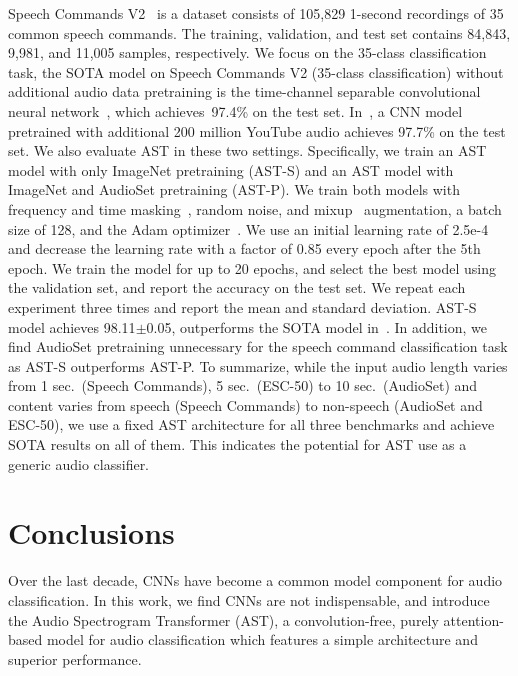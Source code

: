 \documentclass[a4paper]{article}
\begin{document}
Speech Commands V2~\cite{warden2018speech} is a dataset consists of 105,829 1-second recordings of 35 common speech commands. The training, validation, and test set contains 84,843, 9,981, and 11,005 samples, respectively. We focus on the 35-class classification task, the SOTA model on Speech Commands V2 (35-class classification) without additional audio data pretraining is the time-channel separable convolutional neural network~\cite{majumdar2020matchboxnet}, which achieves~97.4\% on the test set. In~\cite{lin2020training}, a CNN model pretrained with additional 200 million YouTube audio achieves 97.7\% on the test set. We also evaluate AST in these two settings. Specifically, we train an AST model with only ImageNet pretraining (AST-S) and an AST model with ImageNet and AudioSet pretraining (AST-P). We train both models with frequency and time masking~\cite{park2019specaugment}, random noise, and mixup~\cite{tokozume2018learning} augmentation, a batch size of 128, and the Adam optimizer~\cite{kingma2015adam}. We use an initial learning rate of 2.5e-4 and decrease the learning rate with a factor of 0.85 every epoch after the 5th epoch. We train the model for up to 20 epochs, and select the best model using the validation set, and report the accuracy on the test set. We repeat each experiment three times and report the mean and standard deviation. AST-S model achieves 98.11$\pm$0.05, outperforms the SOTA model in~\cite{rybakov2020streaming}. In addition, we find AudioSet pretraining unnecessary for the speech command classification task as AST-S outperforms AST-P. 
To summarize, while the input audio length varies from 1 sec.~(Speech Commands), 5 sec.~(ESC-50) to 10 sec.~(AudioSet) and content varies from speech (Speech Commands) to non-speech (AudioSet and ESC-50), we use a fixed AST architecture for all three benchmarks and achieve SOTA results on all of them. This indicates the  potential for AST use as a generic audio classifier.


\section{Conclusions}

Over the last decade, CNNs have become a common model component for audio classification. In this work, we find CNNs are not indispensable, and introduce the Audio Spectrogram Transformer (AST), a convolution-free, purely attention-based model for audio classification which features a simple architecture and superior performance.
\end{document}
